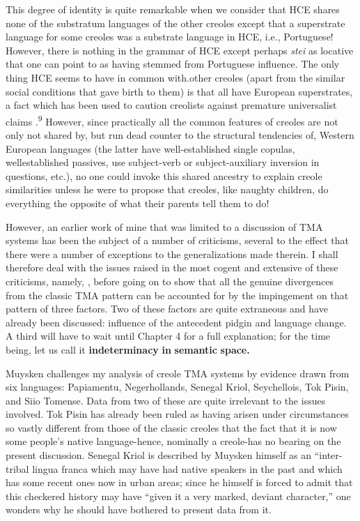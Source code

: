 This degree of identity is quite remarkable when we consider
that HCE shares none of the substratum languages of the other creoles\-
except that a superstrate language for some creoles was a substrate language in HCE, i.e., Portuguese! However, there is nothing in the grammar of HCE except perhaps \textit{stei }as locative that one can point to as having stemmed from Portuguese influence. The only thing HCE seems to have in common with.other creoles (apart from the simi\-lar social conditions that gave birth to them) is that all have European superstrates, a fact which has been used to caution creolists against premature universalist claims \citep{Reinecke1977}.\textsuperscript{9} However, since practi\-cally all the common features of creoles are not only not shared by, but run dead counter to the structural tendencies of, Western Euro\-pean languages (the latter have well-established single copulas, well\-established passives, use subject-verb or subject-auxiliary inversion in questions, etc.), no one could invoke this shared ancestry to explain creole similarities unless he were to propose that creoles, like naughty children, do everything the opposite of what their parents tell them to do!

However, an earlier work of mine \citep{Bickerton1974} that was limited to a discussion of TMA systems has been the subject of a number of criticisms, several to the effect that there were a number of exceptions to the generalizations made therein. I shall therefore deal with the issues raised in the most cogent and extensive of these criti\-cisms, namely, \citet{Muysken1981a}, before going on to show that all the genuine divergences from the classic TMA pattern can be accounted for by the impingement on that pattern of three factors. Two of these factors are quite extraneous and have already been discussed: influence of the antecedent pidgin and language change. A third will have to wait until Chapter 4 for a full explanation; for the time being, let us call it \textbf{{\textquotedbl}indeterminacy} \textbf{in} \textbf{semantic} \textbf{space.{\textquotedbl}}

Muysken challenges my analysis of creole TMA systems by evidence drawn from six languages: Papiamentu, Negerhollands, Senegal Kriol, Seychellois, Tok Pisin, and Siio Tomense. Data from two of these are quite irrelevant to the issues involved. Tok Pisin has already been ruled as having arisen under circumstances so vastly different from those of the classic creoles that the fact that it is now some people's
native language-hence, nominally a creole-has no bearing on the present discussion. Senegal Kriol is described by Muysken himself as an ``inter-tribal lingua franca which may have had native speakers in the past and which has some recent ones now in urban areas{\textquotedbl}; since he himself is forced to admit that this checkered history may have ``given it a very marked, deviant character,'' one wonders why he should have bothered to present data from it.

